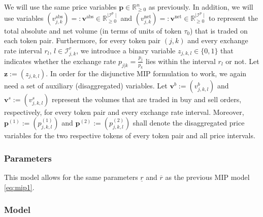 \documentclass[11pt,parskip=full]{scrartcl}%
\newcommand*{\itokenpairs}{\mathcal{I}^p}   %
\begin{document}
We will use the same price variables $ \mathbf{p} \in \mathbb{R}^n_{\ge 0} $ as previously.
In addition, we will use variables $ (v_{j,k}^\mathrm{abs}) =: \mathbf{v}^\mathrm{abs} \in 
\mathbb{R}_{\ge 0}^{\mid \itokenpairs \mid} $ and
$ (v_{j,k}^\mathrm{net}) =: \mathbf{v}^\mathrm{net} \in \mathbb{R}_{\ge 0}^{\mid \itokenpairs \mid}
$ to represent the total absolute and net volume (in terms of units of token $ \tau_0 $) that is
traded on each token pair.
Furthermore, for every token pair $ (j,k) $ and every exchange rate interval $ r_l $,
$ l \in \mathcal{I}_{j,k}^r $, we introduce a binary variable $ z_{j,k,l} \in \{0,1\} $ that
indicates whether the exchange rate $ p_{j|k} = \frac{p_j}{p_k} $ lies within the interval $ r_l $
or not.
Let $ \mathbf{z} := (z_{j,k,l}) $.
In order for the disjunctive MIP formulation to work, we again need a set of auxiliary 
(disaggregated) variables.
Let $ \mathbf{v}^b := (v^b_{j,k,l}) $ and $ \mathbf{v}^s := (v^s_{j,k,l}) $ represent the volumes
that are traded in buy and sell orders, respectively, for every token pair and every exchange rate
interval.
Moreover, $ \mathbf{p}^{(1)} := (p^{(1)}_{j,k,l}) $ and $ \mathbf{p}^{(2)} := (p^{(2)}_{j,k,l}) $
shall denote the disaggregated price variables for the two respective tokens of every token pair
and all price intervals.


\subsubsection*{Parameters}

This model allows for the same parameters $ \underline{r} $ and $ \overline{r} $ as the previous
MIP model \eqref{eq:mip1}.


\subsubsection*{Model}
\end{document}
